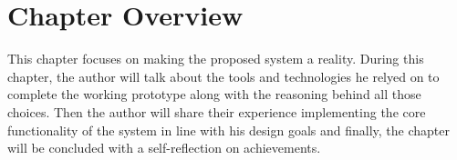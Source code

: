 \section{Chapter Overview}

This chapter focuses on making the proposed system a reality. During this chapter, the author will talk about the tools and technologies he relyed on to complete the working prototype along with the reasoning behind all those choices. Then the author will share their experience implementing the core functionality of the system in line with his design goals and finally, the chapter will be concluded with a self-reflection on achievements.